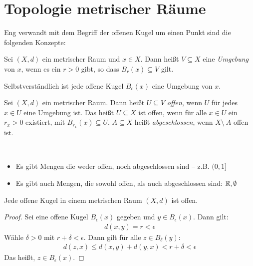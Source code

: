 \cleardoublepage
\section{Topologie metrischer Räume}
Eng verwandt mit dem Begriff der offenen Kugel um einen Punkt sind die folgenden 
Konzepte:

\begin{Definition}{%
	Sei $(X,d)$ ein metrischer Raum und $x \in X$. Dann heißt $V \subseteq X$ eine 
	\emph{Umgebung} von $x$, wenn es ein $r > 0$ gibt, so dass $B_r(x) \subseteq V$ 
	gilt.
}\end{Definition}

\begin{Beispiel}
	Selbstverständlich ist jede offene Kugel $B_\epsilon(x)$ eine Umgebung von $x$.
\end{Beispiel}

\begin{Definition}{%
	Sei $(X,d)$ ein metrischer Raum. Dann heißt $U \subseteq V$ \emph{offen}, wenn 
	$U$ für jedes $x \in U$ eine Umgebung ist.
	Das heißt $U \subseteq X$ ist offen, wenn für alle $x \in U$ ein $r_x > 0$ 
	existiert, mit $B_{r_x}(x) \subseteq U$. 
	$A \subseteq X$ heißt \emph{abgeschlossen}, wenn $X \setminus\ A$ offen ist. 
}\end{Definition}

\begin{Bemerkung}~
	\begin{itemize}
		\item Es gibt Mengen die weder offen, noch abgeschlossen sind -- z.B.  $(0,1]$
		\item Es gibt auch Mengen, die sowohl offen, als auch abgeschlossen sind:
		$\mathbb{R}, \emptyset$
	\end{itemize}
\end{Bemerkung}

\begin{Lemma}{%
	Jede offene Kugel in einem metrischen Raum $(X,d)$ ist offen.
}\end{Lemma}

\begin{proof}
	Sei eine offene Kugel $B_\epsilon(x)$ gegeben und $y \in B_\epsilon(x)$. 
	Dann gilt:
	\begin{align*}
		d(x,y) = r < \epsilon
	\end{align*}
	Wähle $\delta > 0$ mit $r + \delta < \epsilon$. Dann gilt für alle 
	$z \in B_\delta (y)$:
	\begin{align*}
		d(z,x) \leq d(x,y) + d(y,x) < r + \delta < \epsilon
	\end{align*}
	Das heißt, $z \in B_\epsilon(x)$.
\end{proof}
